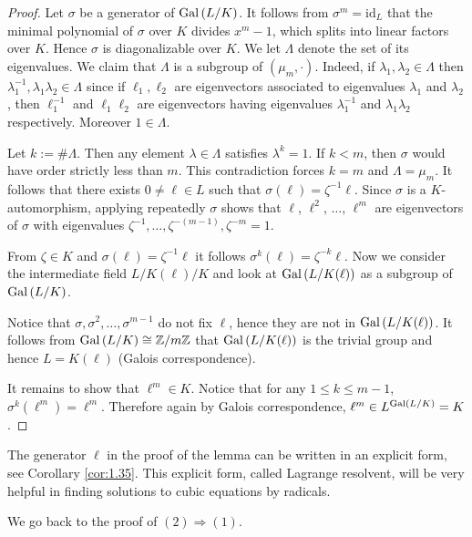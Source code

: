 \documentclass[twoside = false,	%
		headsepline,		%
		parskip = true,
		]{scrbook}						%
\begin{document}
    \begin{proof}
    Let $\sigma$ be a generator of $\mathrm{Gal}\left( L/K\right)$. It follows from $\sigma^m=\mathrm{id}_L$ that the minimal polynomial of $\sigma$ over $K$ divides $x^m-1$, which splits into linear factors over $K$. Hence $\sigma$ is diagonalizable over $K$. We let $\Lambda$ denote the set of its eigenvalues. We claim that $\Lambda$ is a subgroup of $(\mu_m,\cdot)$. Indeed, if $\lambda_1,\lambda_2\in\Lambda$ then $\lambda_1^{-1},\lambda_1\lambda_2\in\Lambda$ since if $\ell_1,\ell_2$ are eigenvectors associated to eigenvalues $\lambda_1$ and $\lambda_2$, then $\ell_1^{-1}$ and $\ell_1\ell_2$ are eigenvectors having eigenvalues $\lambda_1^{-1}$ and $\lambda_1\lambda_2$ respectively.  Moreover $1 \in \Lambda$.
    
    \color{blue} Let $k:=\#\Lambda$. Then any element $\lambda\in\Lambda$ satisfies $\lambda^k=1$. If $k<m$, then $\sigma$ would have order strictly less than $m$. This contradiction forces $k=m$ and $\Lambda=\mu_m$. It follows that there exists $0\neq \ell\in L$ such that $\sigma(\ell)=\zeta^{-1}\ell$. Since $\sigma$ is a $K$-automorphism, applying repeatedly $\sigma$ shows that $\ell$, $\ell^2$, $\ldots$, $\ell^m$ are eigenvectors of $\sigma$ with eigenvalues $\zeta^{-1},\ldots,\zeta^{-(m-1)},\zeta^{-m}=1$.

        From $\zeta \in K$ and $\sigma(\ell) = \zeta^{-1} \ell$ it follows $\sigma^k(\ell) = \zeta^{-k} \ell$. Now we consider the intermediate field $L/K(\ell)/K$ and look at $\mathrm{Gal}\left( L/K(\ell)\right)$ as a subgroup of $\mathrm{Gal}\left( L/K\right)$.
        
        Notice that $\sigma,\sigma^2,\dots,\sigma^{m-1}$ do not fix $\ell$, hence they are not in $\mathrm{Gal}\left( L/K(\ell)\right)$. It follows from $\mathrm{Gal}\left( L/K\right) \cong \mathbb Z/m\mathbb Z$ that $\mathrm{Gal}\left( L/K(\ell)\right)$ is the trivial group and hence $L = K(\ell)$ (Galois correspondence).
        
        It remains to show that $\ell^m \in K$. Notice that for any $1 \leq k \leq m-1$, $\sigma^k(\ell^m) = \ell^m$. Therefore again by Galois correspondence, $\ell^m \in L^{\mathrm{Gal}\left( L/K\right)} = K$.
    \end{proof}
    
    
   The generator $\ell$ in the proof of the lemma can be written in an explicit form, see Corollary \ref{cor:1.35}. This explicit form, called Lagrange resolvent, will be very helpful in finding solutions to cubic equations by radicals.
    
    
    We go back to the proof of $(2) \Rightarrow (1)$.
    
\end{document}
